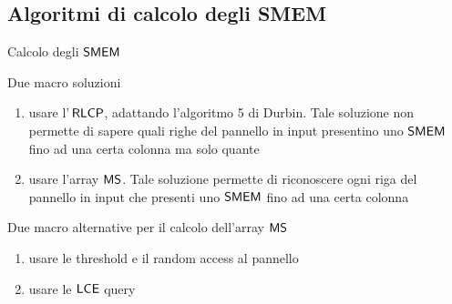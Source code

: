 \documentclass[]{beamer}
\def\LCE{\mbox{\rm {\sf LCE}}}
\def\RLCP{\mbox{\rm {\sf RLCP}}}
\def\MS{\mbox{\rm {\sf MS}}}
\def\SMEM{\mbox{\rm {\sf SMEM}}}
\def\LCE{\mbox{\rm {\sf LCE}}}
\begin{document}
\subsection{Algoritmi di calcolo degli SMEM}
\begin{frame}{Calcolo degli $\SMEM$}
  \begin{block}{Due macro soluzioni}
    \begin{enumerate}
      \item usare l'$\,\RLCP$, adattando l'algoritmo 5 di Durbin. Tale soluzione
      non permette di sapere quali righe del pannello in input presentino uno
      $\SMEM$ fino ad una certa colonna ma solo quante
      \item usare l'array $\MS$. Tale soluzione
      permette di riconoscere ogni riga del pannello in input che presenti uno
      $\SMEM$ fino ad una certa colonna
    \end{enumerate}    
  \end{block}
  \pause
  \begin{block}{Due macro alternative per il calcolo dell'array $\MS$}
    \begin{enumerate}
      \item usare le threshold e il random access al pannello
      \item usare le $\LCE$ query
    \end{enumerate}
  \end{block}
\end{frame}
\end{document}
